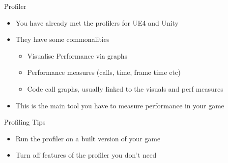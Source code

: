 \begin{frame}{Profiler}
	\begin{itemize}
		\item You have already met the profilers for UE4 and Unity
		\item They have some commonalities
		\begin{itemize}
			\item Visualise Performance via graphs
			\item Performance measures (calls, time, frame time etc)
			\item Code call graphs, usually linked to the visuals and perf measures
		\end{itemize}
		\item This is the main tool you have to measure performance in your game
	\end{itemize}
\end{frame}

\begin{frame}{Profiling Tips}
	\begin{itemize}
		\item Run the profiler on a built version of your game
		\item Turn off features of the profiler you don't need
	\end{itemize}
\end{frame}